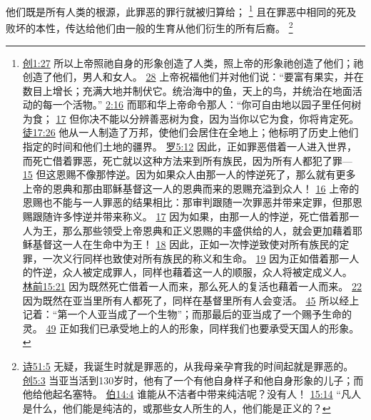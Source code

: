 \documentclass[12pt, a4paper, oneside]{ctexart}
\newcounter{parnum}[section]
\newcommand{\N}{%
   \noindent\refstepcounter{parnum}%
    \makebox[\parindent][l]{\textbf{\arabic{parnum}.}}}
\begin{document}
\N 他们既是所有人类的根源，此罪恶的罪行就被归算给；
	\footnote {
		\href{https://biblehub.com/genesis/1-27.htm}{创1:27} 所以上帝照祂自身的形象创造了人类，照上帝的形象祂创造了他们；祂创造了他们，男人和女人。
		\href{https://biblehub.com/genesis/1-28.htm}{28} 上帝祝福他们并对他们说：“要富有果实，并在数目上增长；充满大地并制伏它。统治海中的鱼，天上的鸟，并统治在地面活动的每一个活物。”
        \href{https://biblehub.com/genesis/2-16.htm}{2:16} 而耶和华上帝命令那人：“你可自由地以园子里任何树为食；
		\href{https://biblehub.com/genesis/2-17.htm}{17} 但你决不能以分辨善恶树为食，因为当你以它为食，你将肯定死。
		\href{https://biblehub.com/acts/17-26.htm}{徒17:26} 他从一人制造了万邦，使他们会居住在全地上；他标明了历史上他们指定的时间和他们土地的疆界。
		\href{https://biblehub.com/romans/5-12.htm}{罗5:12} 因此，正如罪恶借着一人进入世界，而死亡借着罪恶，死亡就以这种方法来到所有族民，因为所有人都犯了罪---
		\href{https://biblehub.com/romans/5-15.htm}{15} 但这恩赐不像那悖逆。因为如果众人由那一人的悖逆死了，那么就有更多上帝的恩典和那由耶稣基督这一人的恩典而来的恩赐充溢到众人！
		\href{https://biblehub.com/romans/5-16.htm}{16} 上帝的恩赐也不能与一人罪恶的结果相比：那审判跟随一次罪恶并带来定罪，但那恩赐跟随许多悖逆并带来称义。
		\href{https://biblehub.com/romans/5-17.htm}{17} 因为如果，由那一人的悖逆，死亡借着那一人为王，那么那些领受上帝恩典和正义恩赐的丰盛供给的人，就会更加藉着耶稣基督这一人在生命中为王！
		\href{https://biblehub.com/romans/5-18.htm}{18} 因此，正如一次悖逆致使对所有族民的定罪，一次义行同样也致使对所有族民的称义和生命。
		\href{https://biblehub.com/romans/5-19.htm}{19} 因为正如借着那一人的忤逆，众人被定成罪人，同样也藉着这一人的顺服，众人将被定成义人。
		\href{https://biblehub.com/1_corinthians/15-21.htm}{林前15:21} 因为既然死亡借着一人而来，那么死人的复活也藉着一人而来。
		\href{https://biblehub.com/1_corinthians/15-22.htm}{22} 因为既然在亚当里所有人都死了，同样在基督里所有人会变活。
		\href{https://biblehub.com/1_corinthians/15-45.htm}{45} 所以经上记着：“第一个人亚当成了一个生物”；而那最后的亚当成了一个赐予生命的灵。
		\href{https://biblehub.com/1_corinthians/15-49.htm}{49} 正如我们已承受地上的人的形象，同样我们也要承受天国人的形象。
	}
	且在罪恶中相同的死及败坏的本性，传达给他们由一般的生育从他们衍生的所有后裔。
	\footnote {
		\href{https://biblehub.com/psalms/51-5.htm}{诗51:5} 无疑，我诞生时就是罪恶的，从我母亲孕育我的时间起就是罪恶的。
		\href{https://biblehub.com/genesis/5-3.htm}{创5:3} 当亚当活到130岁时，他有了一个有他自身样子和他自身形象的儿子；而他给他起名塞特。
		\href{https://biblehub.com/job/14-4.htm}{伯14:4} 谁能从不洁者中带来纯洁呢？没有人！
		\href{https://biblehub.com/job/15-14.htm}{15:14} “凡人是什么，他们能是纯洁的，或那些女人所生的人，他们能是正义的？
	}
\end{document}
